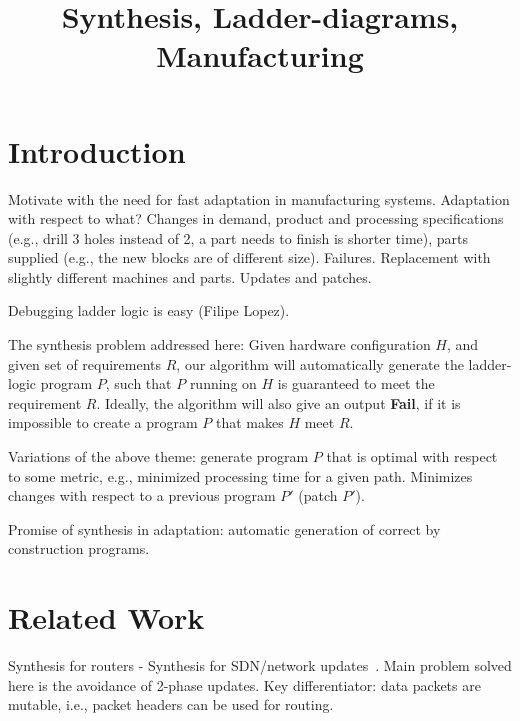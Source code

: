 \documentclass[9pt,conference, compsocconf]{IEEEtran}
\def\titlename{Synthesis, Ladder-diagrams, Manufacturing}
\begin{document}
\title{\titlename}

\author{
}

\date{}

\maketitle

\section{Introduction}
\label{sec:intro}

Motivate with the need for fast adaptation in manufacturing systems. Adaptation with respect to what? Changes in demand, product and processing specifications (e.g., drill 3 holes instead of 2, a part needs to finish is shorter time), parts supplied (e.g., the new blocks are of different size). Failures. Replacement with slightly different machines and parts. Updates and patches.

Debugging ladder logic is easy (Filipe Lopez).

The synthesis problem addressed here: 
Given hardware configuration $H$, and given set of requirements $R$, our algorithm will automatically generate the ladder-logic program $P$, such that $P$ running on $H$ is guaranteed to meet the requirement $R$. 
%
Ideally, the algorithm will also give an output {\bf Fail\/}, if it is impossible to create a program $P$ that makes $H$ meet $R$.

Variations of the above theme: generate program $P$ that is optimal with respect to some metric, e.g., minimized processing time for a given path. Minimizes changes with respect to a previous program $P'$ (patch $P'$). 

Promise of synthesis in adaptation: automatic generation of correct by construction programs.  


\section{Related Work}
\label{sec:related}
Synthesis for routers
- Synthesis for SDN/network updates~\cite{McClurg:2015PLDI}. Main problem solved here is the avoidance of 2-phase updates.
Key differentiator: data packets are mutable, i.e., packet headers can be used for routing. 
\end{document}
